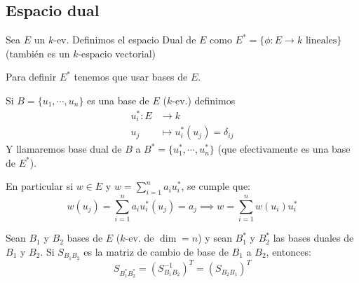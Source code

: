 

\subsection{Espacio dual}

\begin{defi}
	Sea $E$ un $k$-ev. Definimos el espacio Dual de $E$ como
	$E^* = \{ \phi : E \to k \text{ lineales} \}$ (también es un
	$k$-espacio vectorial)
\end{defi}
\begin{obs}
	Para definir $E^*$ tenemos que usar bases de $E$.
\end{obs}
\begin{defi}
	Si $B = \{ u_1,\cdots, u_n \}$ es una base de $E$ ($k$-ev.)
	definimos
	\[
		\begin{aligned}
			u_i^* \colon E &\to k\\
			u_j &\mapsto u_i^*(u_j) = \delta_{ij}
		\end{aligned}
	\]
	Y llamaremos base dual de $B$ a
	$B^* = \{ u_1^*, \cdots, u_n^* \}$ (que efectivamente es una
	base de $E^*$).
\end{defi}
\begin{obs}
	En particular si $w \in E$ y
	$\displaystyle w = \sum_{i=1}^{n} a_i u_i^*$, se cumple que:
	\[
		w(u_j) = \sum_{i=1}^{n} a_i u_i^*(u_j) = a_j
		\implies
		w = \sum_{i=1}^{n}w(u_i)u_i^*
	\]
\end{obs}

\begin{prop}
	Sean $B_1$ y $B_2$ bases de $E$ ($k$-ev. de $\dim = n$) y
	sean $B_1^*$ y $B_2^*$ las bases duales de $B_1$ y $B_2$.
	Si $S_{B_1B_2}$ es la matriz de cambio de base de $B_1$ a
	$B_2$, entonces:
	\[
		S_{B_1^*B_2^*} = (S_{B_1B_2}^{-1})^T = (S_{B_2B_1})^T
	\]
\end{prop}

